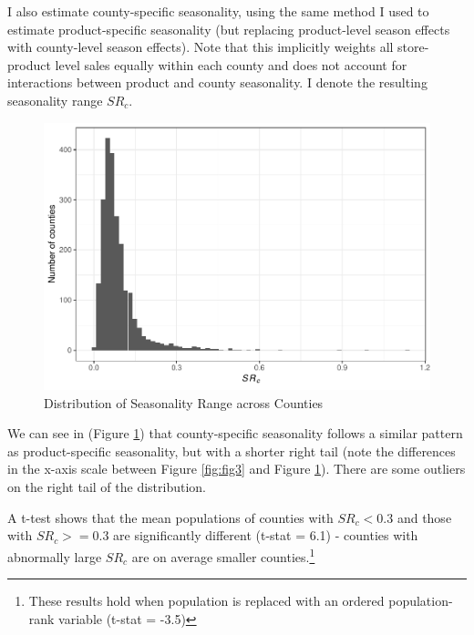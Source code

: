 \documentclass[]{article}
\let\rmarkdownfootnote\footnote%
\def\footnote{\protect\rmarkdownfootnote}
\begin{document}
I also estimate county-specific seasonality, using the same method I
used to estimate product-specific seasonality (but replacing
product-level season effects with county-level season effects). Note
that this implicitly weights all store-product level sales equally
within each county and does not account for interactions between product
and county seasonality. I denote the resulting seasonality range
\(SR_c.\)

\begin{figure}
\centering
\includegraphics{exploring_heterogeneity_v2_files/figure-latex/plot_seasonality_county-1.pdf}
\caption{\label{fig:fig4}Distribution of Seasonality Range across
Counties}
\end{figure}

We can see in (Figure \ref{fig:fig4}) that county-specific seasonality
follows a similar pattern as product-specific seasonality, but with a
shorter right tail (note the differences in the x-axis scale between
Figure \ref{fig:fig3} and Figure \ref{fig:fig4}). There are some
outliers on the right tail of the distribution.

A t-test shows that the mean populations of counties with \(SR_c < 0.3\)
and those with \(SR_c >= 0.3\) are significantly different (t-stat =
6.1) - counties with abnormally large \(SR_c\) are on average smaller
counties.\footnote{These results hold when population is replaced with
  an ordered population-rank variable (t-stat = -3.5)}
\end{document}
